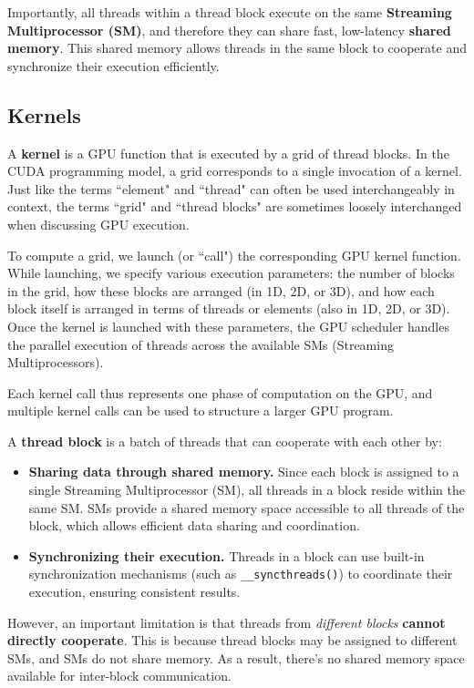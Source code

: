 \documentclass[12pt]{book}
\begin{document}
Importantly, all threads within a thread block execute on the same \textbf{Streaming Multiprocessor (SM)}, and therefore they can share fast, low-latency \textbf{shared memory}. This shared memory allows threads in the same block to cooperate and synchronize their execution efficiently.

\subsection{Kernels}
A \textbf{kernel} is a GPU function that is executed by a grid of thread blocks. In the CUDA programming model, a grid corresponds to a single invocation of a kernel. Just like the terms ``element" and ``thread" can often be used interchangeably in context, the terms ``grid" and ``thread blocks" are sometimes loosely interchanged when discussing GPU execution.

To compute a grid, we launch (or ``call") the corresponding GPU kernel function. While launching, we specify various execution parameters: the number of blocks in the grid, how these blocks are arranged (in 1D, 2D, or 3D), and how each block itself is arranged in terms of threads or elements (also in 1D, 2D, or 3D). Once the kernel is launched with these parameters, the GPU scheduler handles the parallel execution of threads across the available SMs (Streaming Multiprocessors).

Each kernel call thus represents one phase of computation on the GPU, and multiple kernel calls can be used to structure a larger GPU program.

A \textbf{thread block} is a batch of threads that can cooperate with each other by:

\begin{itemize}
    \item \textbf{Sharing data through shared memory.} Since each block is assigned to a single Streaming Multiprocessor (SM), all threads in a block reside within the same SM. SMs provide a shared memory space accessible to all threads of the block, which allows efficient data sharing and coordination.
    
    \item \textbf{Synchronizing their execution.} Threads in a block can use built-in synchronization mechanisms (such as \texttt{\_\_syncthreads()}) to coordinate their execution, ensuring consistent results.
\end{itemize}

However, an important limitation is that threads from \emph{different blocks} \textbf{cannot directly cooperate}. This is because thread blocks may be assigned to different SMs, and SMs do not share memory. As a result, there's no shared memory space available for inter-block communication.
\end{document}

